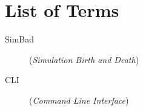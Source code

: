 \chapter*{List of Terms}\mbox{}
\label{sec:skroty}
\noindent
\begin{description}
  \item [SimBad] (\emph{Simulation Birth and Death})
  \item [CLI] (\emph{Command Line Interface})
\end{description}
